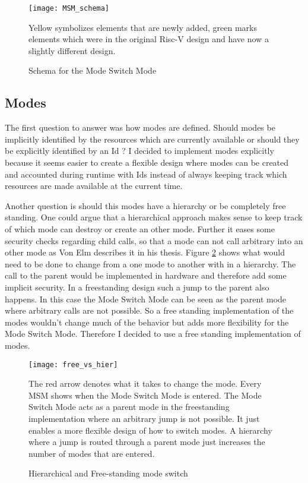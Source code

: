 \begin{figure}[h]
    \centering
    \texttt{[image: MSM\_schema]}
    \captionsetup{justification=centering}
    \caption{Schema for the Mode Switch Mode}
            Yellow symbolizes elements that are newly added, green marks
            elements which were in the original Risc-V design and have now a
            slightly different design. 
    \label{fig:msm_schema}
\end{figure}

\subsection{Modes}
The first question to answer was how modes are defined. Should modes be
implicitly identified by the resources which are currently available or should
they be explicitly identified by an Id ? I decided to implement modes explicitly
because it seems easier to create a flexible design where modes can be created
and accounted during runtime with Ids instead of always keeping track which
resources are made available at the current time.\par
Another question is should this modes have a hierarchy or be completely free
standing. One could argue that a hierarchical approach makes sense to keep track
of which mode can destroy or create an other mode. Further it eases some
security checks regarding child calls, so that a mode can not call arbitrary
into an other mode as Von Elm describes it in his thesis. Figure \ref{fig:free_schema} shows what would
need to be done to change from a one mode to another with in a hierarchy. The
call to the parent would be implemented in hardware and therefore add some
implicit security. In a freestanding design such a jump to the parent also
happens. In this case the Mode Switch Mode can be seen as the parent mode where
arbitrary calls are not possible. So a free standing implementation of the
modes wouldn't change much of the behavior but adds more flexibility for the
Mode Switch Mode. Therefore I decided to use a free standing implementation of
modes.

\begin{figure}[h]
    \centering
    \texttt{[image: free\_vs\_hier]} 
    \captionsetup{justification=centering}
    \caption{Hierarchical and Free-standing mode switch}
            The red arrow denotes what it takes to change the mode. Every MSM
            shows when the Mode Switch Mode is entered. The Mode Switch Mode
            acts as a parent mode in the freestanding implementation where an
            arbitrary jump is not possible. It just enables a more flexible
            design of how to switch modes. A hierarchy where a jump is routed
            through a parent mode just increases the number of modes that are
            entered.
    \label{fig:free_schema}
\end{figure}

